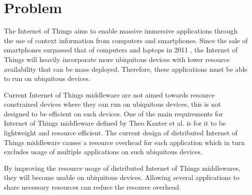 \section{Problem}
\label{problem}
The Internet of Things aims to enable massive immersive applications through the use of context information from computers and smartphones. Since the sale of smartphones surpassed that of computers and laptops in 2011 \cite{canalsys}, the Internet of Things will heavily incorporate more ubiquitous devices with lower resource availability that can be mass deployed. Therefore, these applications must be able to run on ubiquitous devices.

Current Internet of Things middleware are not aimed towards resource constrained devices where they can run on ubiquitous devices, this is not designed to be efficient on such devices. One of the main requirements for Internet of Things middleware defined by Theo Kanter et al. \cite{Kanter539187} is for it to be lightweight and resource efficient. The current design of distributed Internet of Things middleware causes a resource overhead for each application which in turn excludes usage of multiple applications on such ubiquitous devices. 

By improving the resource usage of distributed Internet of Things middlewares, they will become usable on ubiquitous devices. Allowing several applications to share necessary resources can reduce the resource overhead. 


